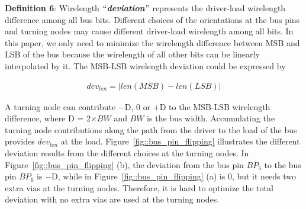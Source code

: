 {\bf Definition 6}: Wirelength $``$\textbf{\textit{deviation}}$"$
represents the driver-load wirelength difference among all bus bits.
Different choices of the orientations at the bus pins and
turning nodes may cause different driver-load wirelength among all
bits. In this paper, we only need to minimize the wirelength
difference between MSB and LSB of the bus because the wirelength
of all other bits can be linearly interpolated by it. The MSB-LSB
wirelength deviation could be expressed by

\begin{eqnarray}
dev_{len} = | len(MSB) - len(LSB)|
\end{eqnarray}

A turning node can contribute $-$D, 0 or $+$D to the MSB-LSB
wirelength difference, where D = 2$\times$$BW$ and $BW$ is the bus width.
Accumulating the turning node contributions along the path from
the driver to the load of the bus provides $dev_{len}$ at the
load. Figure~\ref{fig::bus_pin_flipping} illustrates the different
deviation results from the different choices at the turning nodes.
In Figure~\ref{fig::bus_pin_flipping} (b), the deviation from the
bus pin $BP_5$ to the bus pin $BP_6$ is $-$D, while in
Figure~\ref{fig::bus_pin_flipping} (a) is 0, but it needs two
extra vias at the turning nodes. Therefore, it is hard to
optimize the total deviation with no extra vias are used at the
turning nodes.
